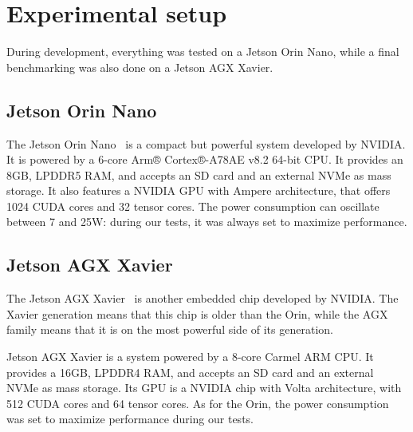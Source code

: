 \chapter{Experimental setup}
\label{chap:experim-setup}

During development, everything was tested on a Jetson Orin Nano, while a final benchmarking was also done on a Jetson AGX Xavier.

\section{Jetson Orin Nano}

The Jetson Orin Nano~\cite{jetson} is a compact but powerful system developed by NVIDIA.
It is powered by a 6-core Arm® Cortex®-A78AE v8.2 64-bit CPU.
It provides an 8GB, LPDDR5 RAM, and accepts an SD card and an external NVMe as mass storage.
It also features a NVIDIA GPU with Ampere architecture, that offers 1024 CUDA cores and 32 tensor cores.
The power consumption can oscillate between 7 and 25W: during our tests, it was always set to maximize performance.

\section{Jetson AGX Xavier}

The Jetson AGX Xavier~\cite{xavier} is another embedded chip developed by NVIDIA.
The Xavier generation means that this chip is older than the Orin, while the AGX family means that it is on the most powerful side of its generation.

Jetson AGX Xavier is a system powered by a 8-core Carmel ARM CPU.
It provides a 16GB, LPDDR4 RAM, and accepts an SD card and an external NVMe as mass storage.
Its GPU is a NVIDIA chip with Volta architecture, with 512 CUDA cores and 64 tensor cores.
As for the Orin, the power consumption was set to maximize performance during our tests.

